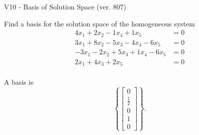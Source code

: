 \begin{exercise}
  \begin{exerciseTitle}V10 - Basis of Solution Space (ver. 807)\end{exerciseTitle}
  \begin{exerciseStatement}
    Find a basis for the solution space of the homogeneous system 
\begin{align*}
 4 x_ 1 + 2 x_ 2 -1 x_ 4 + 1 x_ 5 &= 0  \\ 
  3 x_ 1 + 8 x_ 2 -5 x_ 3 -4 x_ 4 -6 x_ 5 &= 0  \\ 
  -3 x_ 1 -2 x_ 2 + 5 x_ 3 + 1 x_ 4 -6 x_ 5 &= 0  \\ 
  2 x_ 1 + 4 x_ 3 + 2 x_ 5 &= 0  \\ 
 \end{align*}


 
  \end{exerciseStatement}

  \begin{exerciseAnswer}
   A basis is   
\[\left\{\left[\begin{array}{c}
0 \\
\frac{1}{2} \\
0 \\
1 \\
0
\end{array}\right]\right\}.\]

  


  \end{exerciseAnswer}
\end{exercise}